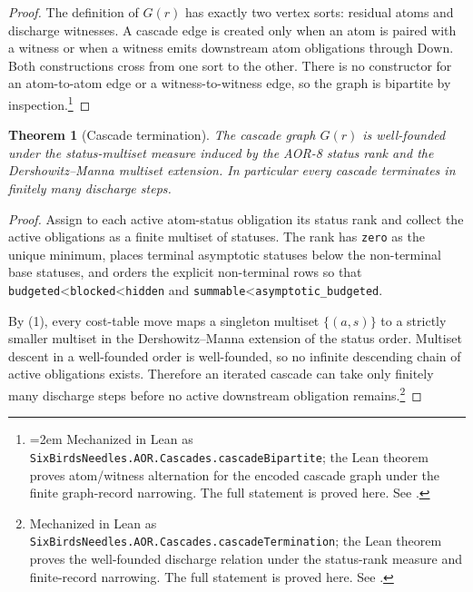 \documentclass[11pt]{article}
\newtheorem{theorem}{Theorem}[section]
\theoremstyle{definition}
\begin{document}
\begin{proof}
The definition of \(G(r)\) has exactly two vertex sorts: residual atoms and
discharge witnesses.  A cascade edge is created only when an atom is paired
with a witness or when a witness emits downstream atom obligations through
\(\mathrm{Down}\).  Both constructions cross from one sort to the other.  There is
no constructor for an atom-to-atom edge or a witness-to-witness edge, so the
graph is bipartite by inspection.\footnote{\emergencystretch=2em Mechanized in Lean as
\texttt{SixBirdsNeedles.AOR.Cascades.cascadeBipartite}; the Lean
theorem proves atom/witness alternation for the encoded cascade graph
under the finite graph-record narrowing. The full statement is proved
here. See .}
\end{proof}

\begin{theorem}[Cascade termination]\label{thm:aor:cascade-termination}
The cascade graph $G(r)$ is well-founded under the
status-multiset measure induced by the AOR-8 status rank and the
Dershowitz--Manna multiset extension.  In particular every cascade
terminates in finitely many discharge steps.
\end{theorem}

\begin{proof}
Assign to each active atom-status obligation its status rank and collect the
active obligations as a finite multiset of statuses.  The rank has
\texttt{zero} as the unique minimum, places terminal asymptotic statuses
below the non-terminal base statuses, and orders the explicit non-terminal
rows so that \texttt{budgeted}<\texttt{blocked}<\texttt{hidden} and
\texttt{summable}<\texttt{asymptotic\_budgeted}.

By (1), every cost-table move maps a
singleton multiset \(\{(a,s)\}\) to a strictly smaller multiset in the
Dershowitz--Manna extension of the status order.  Multiset descent in
a well-founded order is well-founded, so no infinite descending chain of
active obligations exists.  Therefore an iterated cascade can take only
finitely many discharge steps before no active downstream obligation remains.\footnote{Mechanized in Lean as \texttt{SixBirdsNeedles.AOR.Cascades.cascadeTermination}; the Lean theorem proves the well-founded discharge relation under the status-rank measure and finite-record narrowing. The full statement is proved here. See .}
\end{proof}
\end{document}
